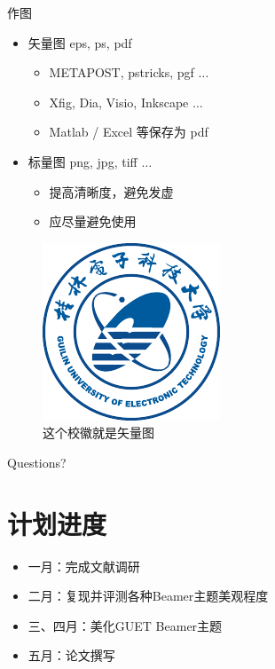\documentclass[compress,aspectratio=43,10pt,UTF8]{ctexbeamer}
\begin{document}
\begin{frame}{作图}
    \begin{itemize}
        \item 矢量图 eps, ps, pdf
        \begin{itemize}
            \item METAPOST, pstricks, pgf $\ldots$
            \item Xfig, Dia, Visio, Inkscape $\ldots$
            \item Matlab / Excel 等保存为 pdf
        \end{itemize}
        \item 标量图 png, jpg, tiff $\ldots$
        \begin{itemize}
            \item 提高清晰度，避免发虚
            \item 应尽量避免使用
        \end{itemize}
    \end{itemize}
    \begin{figure}[htpb]
        \centering
        \includegraphics[width=0.2\linewidth]{Guet-logo.pdf}
        \caption{这个校徽就是矢量图}
    \end{figure}
\end{frame}

{
\begin{frame}[standout]
  Questions?
\end{frame}
}

\section{计划进度}
\begin{frame}
    \begin{itemize}
        \item 一月：完成文献调研
        \item 二月：复现并评测各种Beamer主题美观程度
        \item 三、四月：美化GUET Beamer主题
        \item 五月：论文撰写
    \end{itemize}
\end{frame}
\end{document}
